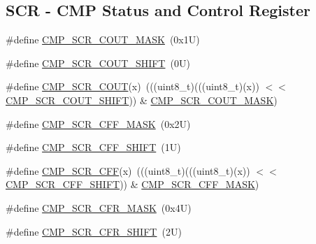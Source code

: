 \subsection*{S\+CR -\/ C\+MP Status and Control Register}
\begin{DoxyCompactItemize}
\item 
\#define \mbox{\hyperlink{group___c_m_p___register___masks_ga024aec72a28ecdc04a1441cd7a3af23a}{C\+M\+P\+\_\+\+S\+C\+R\+\_\+\+C\+O\+U\+T\+\_\+\+M\+A\+SK}}~(0x1\+U)
\item 
\#define \mbox{\hyperlink{group___c_m_p___register___masks_gaa508076192a6b9aed5c4d46282c64394}{C\+M\+P\+\_\+\+S\+C\+R\+\_\+\+C\+O\+U\+T\+\_\+\+S\+H\+I\+FT}}~(0\+U)
\item 
\#define \mbox{\hyperlink{group___c_m_p___register___masks_gaff457b5ca15d0bc33dad1e49ac9793cf}{C\+M\+P\+\_\+\+S\+C\+R\+\_\+\+C\+O\+UT}}(x)~(((uint8\+\_\+t)(((uint8\+\_\+t)(x)) $<$$<$ \mbox{\hyperlink{group___c_m_p___register___masks_gaa508076192a6b9aed5c4d46282c64394}{C\+M\+P\+\_\+\+S\+C\+R\+\_\+\+C\+O\+U\+T\+\_\+\+S\+H\+I\+FT}})) \& \mbox{\hyperlink{group___c_m_p___register___masks_ga024aec72a28ecdc04a1441cd7a3af23a}{C\+M\+P\+\_\+\+S\+C\+R\+\_\+\+C\+O\+U\+T\+\_\+\+M\+A\+SK}})
\item 
\#define \mbox{\hyperlink{group___c_m_p___register___masks_gaab44e3da0576b12dd809881323944a1c}{C\+M\+P\+\_\+\+S\+C\+R\+\_\+\+C\+F\+F\+\_\+\+M\+A\+SK}}~(0x2\+U)
\item 
\#define \mbox{\hyperlink{group___c_m_p___register___masks_ga076d455f0d5bdad02282cbcce6e04c01}{C\+M\+P\+\_\+\+S\+C\+R\+\_\+\+C\+F\+F\+\_\+\+S\+H\+I\+FT}}~(1\+U)
\item 
\#define \mbox{\hyperlink{group___c_m_p___register___masks_ga3cf21e20fb83bffcac05736f6f7c797d}{C\+M\+P\+\_\+\+S\+C\+R\+\_\+\+C\+FF}}(x)~(((uint8\+\_\+t)(((uint8\+\_\+t)(x)) $<$$<$ \mbox{\hyperlink{group___c_m_p___register___masks_ga076d455f0d5bdad02282cbcce6e04c01}{C\+M\+P\+\_\+\+S\+C\+R\+\_\+\+C\+F\+F\+\_\+\+S\+H\+I\+FT}})) \& \mbox{\hyperlink{group___c_m_p___register___masks_gaab44e3da0576b12dd809881323944a1c}{C\+M\+P\+\_\+\+S\+C\+R\+\_\+\+C\+F\+F\+\_\+\+M\+A\+SK}})
\item 
\#define \mbox{\hyperlink{group___c_m_p___register___masks_ga876bfa2799338c6b10b152940d25c4a7}{C\+M\+P\+\_\+\+S\+C\+R\+\_\+\+C\+F\+R\+\_\+\+M\+A\+SK}}~(0x4\+U)
\item 
\#define \mbox{\hyperlink{group___c_m_p___register___masks_ga78595d16db987c96e73ce96fc5436f6b}{C\+M\+P\+\_\+\+S\+C\+R\+\_\+\+C\+F\+R\+\_\+\+S\+H\+I\+FT}}~(2\+U)
\item 

\end{DoxyCompactItemize}
